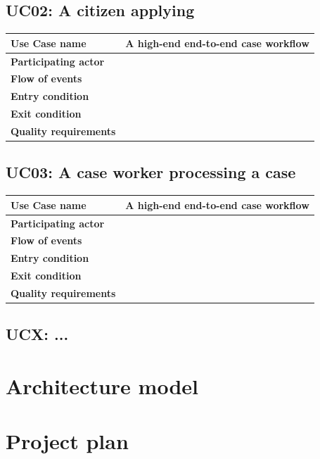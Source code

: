 \documentclass{article}
\begin{document}
\subsection{UC02: A citizen applying}

\begin{tabularx}{\textwidth}{l|l}
	\textbf{Use Case name} & A high-end end-to-end case workflow \\
	\hline
	\textbf{Participating actor} & \\
	\hline
	\textbf{Flow of events} & \\
	\hline
	\textbf{Entry condition} & \\
	\hline
	\textbf{Exit condition} & \\
	\hline
	\textbf{Quality requirements} & \\
\end{tabularx}

\subsection{UC03: A case worker processing a case}
\begin{tabularx}{\textwidth}{l|l}
	\textbf{Use Case name} & A high-end end-to-end case workflow \\
	\hline
	\textbf{Participating actor} & \\
	\hline
	\textbf{Flow of events} & \\
	\hline
	\textbf{Entry condition} & \\
	\hline
	\textbf{Exit condition} & \\
	\hline
	\textbf{Quality requirements} & \\
\end{tabularx}

\subsection{UCX: ...}

\section{Architecture model}


\section{Project plan}
\end{document}
